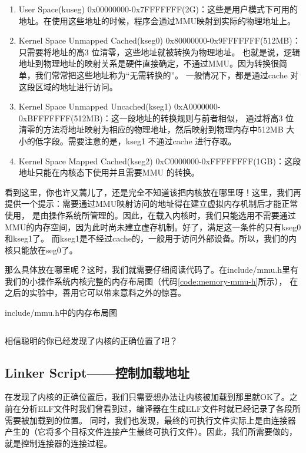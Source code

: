 \begin{enumerate}
  \item User Space(kuseg) 0x00000000-0x7FFFFFFF(2G)：这些是用户模式下可用的地址。在使用这些地址的时候，程序会通过MMU映射到实际的物理地址上。
  \item Kernel Space Unmapped Cached(kseg0) 0x80000000-0x9FFFFFFF(512MB)：只需要将地址的高3 位清零，这些地址就被转换为物理地址。
也就是说，逻辑地址到物理地址的映射关系是硬件直接确定，不通过MMU。因为转换很简单，我们常常把这些地址称为“无需转换的”。
一般情况下，都是通过cache 对这段区域的地址进行访问。
  \item Kernel Space Unmapped Uncached(kseg1) 0xA0000000-0xBFFFFFFF(512MB)：这一段地址的转换规则与前者相似，
通过将高3 位清零的方法将地址映射为相应的物理地址，然后映射到物理内存中512MB 大小的低字段。需要注意的是，kseg1 不通过cache 进行存取。
  \item Kernel Space Mapped Cached(kseg2) 0xC0000000-0xFFFFFFFF(1GB)：这段地址只能在内核态下使用并且需要MMU 的转换。
\end{enumerate}

看到这里，你也许又蔫儿了，还是完全不知道该把内核放在哪里呀！这里，我们再提供一个提示：需要通过MMU映射访问的地址得在建立虚拟内存机制后才能正常使用，
是由操作系统所管理的。因此，在载入内核时，我们只能选用不需要通过MMU的内存空间，因为此时尚未建立虚存机制。好了，满足这一条件的只有kseg0和kseg1了。
而kseg1是不经过cache的，一般用于访问外部设备。所以，我们的内核只能放在seg0了。

那么具体放在哪里呢？这时，我们就需要仔细阅读代码了。在include/mmu.h里有我们的小操作系统内核完整的内存布局图（代码\ref{code:memory-mmu-h}所示），
在之后的实验中，善用它可以带来意料之外的惊喜。

\begin{codeBoxWithCaption}{include/mmu.h中的内存布局图\label{code:memory-mmu-h}}
  \inputminted[linenos]{c}{codes/memory-mmu.h}
\end{codeBoxWithCaption}

相信聪明的你已经发现了内核的正确位置了吧？

\subsection{Linker Script——控制加载地址}
在发现了内核的正确位置后，我们只需要想办法让内核被加载到那里就OK了。之前在分析ELF文件时我们曾看到过，编译器在生成ELF文件时就已经记录了各段所需要被加载到的位置。
同时，我们也发现，最终的可执行文件实际上是由连接器产生的（它将多个目标文件连接产生最终可执行文件）。因此，我们所需要做的，就是控制连接器的连接过程。

